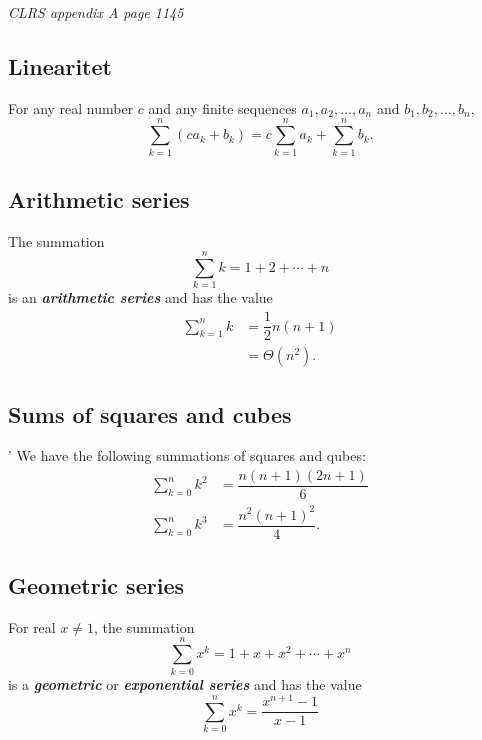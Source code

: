\textit{CLRS appendix A page 1145}

\subsection{Linearitet}
For any real number $ c $ and any finite sequences $ a_1,a_2,\ldots,a_n $ and $ b_1,b_2,\ldots,b_n $,
$$ \sum_{k=1}^{n}\left( ca_k+b_k\right) = c \sum_{k=1}^{n}a_k + \sum_{k=1}^{n}b_k. $$

\subsection{Arithmetic series}
The summation
$$ \sum_{k=1}^{n}k = 1+2+\cdots+n $$
is an \textbf{\textit{arithmetic series}} and has the value
\begin{align*}
\sum_{k=1}^{n}k &= \dfrac{1}{2}n(n+1)\\
&= \Theta\left( n^2\right) .
\end{align*}

\subsection{Sums of squares and cubes}'
We have the following summations of squares and qubes:
\begin{align*}
\sum_{k=0}^{n}k^2&=\dfrac{n(n+1)(2n+1)}{6}\\
\sum_{k=0}^{n}k^3&=\dfrac{n^2(n+1)^2}{4}.
\end{align*}

\subsection{Geometric series}
For real $ x \neq 1 $, the summation
$$ \sum_{k=0}^{n}x^k = 1+x+x^2+\cdots+x^n $$
is a \textit{\textbf{geometric}} or \textbf{\textit{exponential series}} and has the value
$$ \sum_{k=0}^{n}x^k = \dfrac{x^{n+1}-1}{x-1} $$
